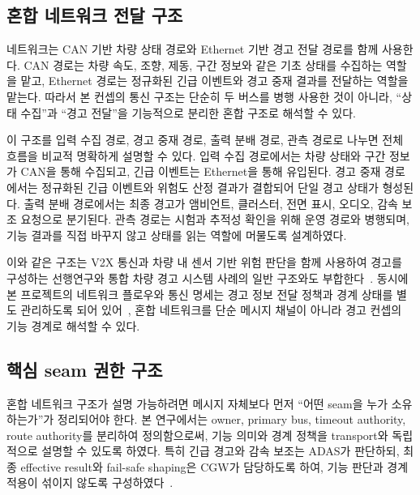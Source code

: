 \documentclass[10pt,a4paper,twocolumn]{article}
\begin{document}
\subsection{혼합 네트워크 전달 구조}

네트워크는 CAN 기반 차량 상태 경로와 Ethernet 기반 경고 전달 경로를 함께 사용한다. CAN 경로는 차량 속도, 조향, 제동, 구간 정보와 같은 기초 상태를 수집하는 역할을 맡고, Ethernet 경로는 정규화된 긴급 이벤트와 경고 중재 결과를 전달하는 역할을 맡는다. 따라서 본 컨셉의 통신 구조는 단순히 두 버스를 병행 사용한 것이 아니라, ``상태 수집''과 ``경고 전달''을 기능적으로 분리한 혼합 구조로 해석할 수 있다.

이 구조를 입력 수집 경로, 경고 중재 경로, 출력 분배 경로, 관측 경로로 나누면 전체 흐름을 비교적 명확하게 설명할 수 있다. 입력 수집 경로에서는 차량 상태와 구간 정보가 CAN을 통해 수집되고, 긴급 이벤트는 Ethernet을 통해 유입된다. 경고 중재 경로에서는 정규화된 긴급 이벤트와 위험도 산정 결과가 결합되어 단일 경고 상태가 형성된다. 출력 분배 경로에서는 최종 경고가 앰비언트, 클러스터, 전면 표시, 오디오, 감속 보조 요청으로 분기된다. 관측 경로는 시험과 추적성 확인을 위해 운영 경로와 병행되며, 기능 결과를 직접 바꾸지 않고 상태를 읽는 역할에 머물도록 설계하였다.

이와 같은 구조는 V2X 통신과 차량 내 센서 기반 위험 판단을 함께 사용하여 경고를 구성하는 선행연구와 통합 차량 경고 시스템 사례의 일반 구조와도 부합한다~\cite{sensors_v2x_collision,nhtsa_ivbss}. 동시에 본 프로젝트의 네트워크 플로우와 통신 명세는 경고 정보 전달 정책과 경계 상태를 별도 관리하도록 되어 있어~\cite{comm_spec,nw_flow}, 혼합 네트워크를 단순 메시지 채널이 아니라 경고 컨셉의 기능 경계로 해석할 수 있다.

\subsection{핵심 seam 권한 구조}

혼합 네트워크 구조가 설명 가능하려면 메시지 자체보다 먼저 ``어떤 seam을 누가 소유하는가''가 정리되어야 한다. 본 연구에서는 owner, primary bus, timeout authority, route authority를 분리하여 정의함으로써, 기능 의미와 경계 정책을 transport와 독립적으로 설명할 수 있도록 하였다. 특히 긴급 경고와 감속 보조는 ADAS가 판단하되, 최종 effective result와 fail-safe shaping은 CGW가 담당하도록 하여, 기능 판단과 경계 적용이 섞이지 않도록 구성하였다~\cite{comm_spec,sysvar_spec}.
\end{document}
